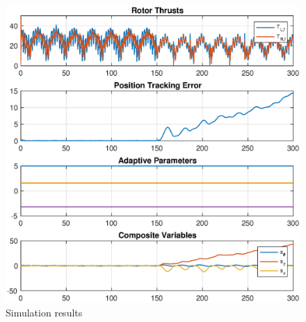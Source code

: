 \documentclass{beamer}
\begin{document}
{\begin{columns}
\begin{column}{0.63\textwidth}
\begin{figure}[h!]
	\includegraphics[width=\textwidth]{circle_noadap}
	\caption{Simulation results}
	\label{circle_data_2}
\end{figure}
\end{column}
\end{columns}
\normalsize
}
\end{document}
